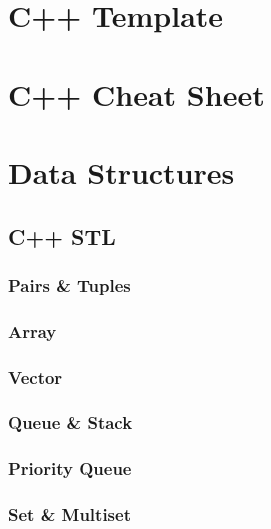 \documentclass[10pt,landscape,twocolumn,a4paper,notitlepage]{article}
\begin{document}
\def\title{Pablo Messina's ICPC Notebook}
\tableofcontents\newpage

\section{C++ Template}


\section{C++ Cheat Sheet}



\section{Data Structures}
  \subsection{C++ STL}
    \subsubsection{Pairs \& Tuples}
    
    \subsubsection{Array}
    
    \subsubsection{Vector}
    
    \subsubsection{Queue \& Stack}
    
    \subsubsection{Priority Queue}
    
    \subsubsection{Set \& Multiset}
    
\end{document}
